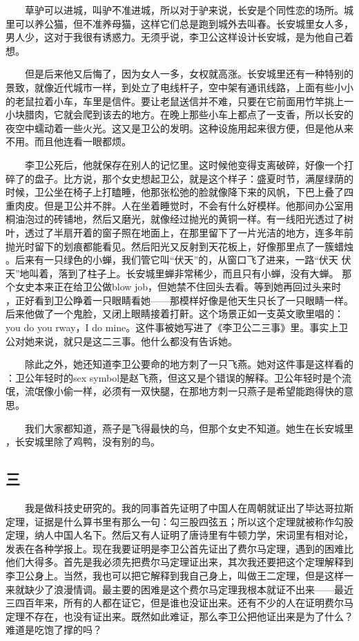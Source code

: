  　　草驴可以进城，叫驴不准进城，所以对于驴来说，长安是个同性恋的场所。城 里可以养公猫，但不准养母猫，这样它们总是跑到城外去叫春。长安城里女人多， 男人少，这对于我很有诱惑力。无须乎说，李卫公这样设计长安城，是为他自己着 想。 

　　但是后来他又后悔了，因为女人一多，女权就高涨。长安城里还有一种特别的 景致，就像近代城市一样，到处立了电线杆子，空中架有通讯线路，上面有些小小 的老鼠拉着小车，车里是信件。要让老鼠送信并不难，只要在它前面用竹竿挑上一 小块腊肉，它就会爬到该去的地方。在晚上那些小车上都点了一支香，所以长安的 夜空中蠕动着一些火光。这又是卫公的发明。这种设施用起来很方便，但是他从来 不用。而且他连看一眼都烦。 

　　李卫公死后，他就保存在别人的记忆里。这时候他变得支离破碎，好像一个打 碎了的盘子。比方说，那个女史想起卫公，就是这个样子：盛夏时节，满屋绿荫的 时候，卫公坐在椅子上打瞌睡，他那张松弛的脸就像降下来的风帆，下巴上叠了四 重肉皮。但是卫公并不胖。人在坐着睡觉时，不会有什么好模样。他那间办公室用 桐油泡过的砖铺地，然后又磨光，就像经过抛光的黄铜一样。有一线阳光透过了树 叶，透过了半扇开着的窗子照在地面上，在那里留下了一片光洁的地方，连多年前 抛光时留下的划痕都能看见。然后阳光又反射到天花板上，好像那里点了一簇蜡烛 。后来有一只绿色的小蝉，我们管它叫“伏天”的，从窗口飞了进来，一路“伏天 伏天”地叫着，落到了柱子上。长安城里蝉非常稀少，而且只有小蝉，没有大蝉。 那个女史本来正在给卫公做blow job，但她禁不住回头去看。等到她再回过头来时 ，正好看到卫公睁着一只眼睛看她——那模样好像是他天生只长了一只眼睛一样。 后来他做了一个鬼脸，又闭上眼睛接着打鼾。这个场景正如一支英文歌里唱的： you do you rway，I do mine。这件事被她写进了《李卫公二三事》里。事实上卫 公对她来说，就只是这二三事。他什么都没有告诉她。

 　　除此之外，她还知道李卫公要命的地方刺了一只飞燕。她对这件事是这样看的 ：卫公年轻时的sex symbol是赵飞燕，但这又是个错误的解释。卫公年轻时是个流 氓，流氓像小偷一样，必须有一双快腿，在那地方刺一只燕子是希望能跑得快的意 思。 

　　我们大家都知道，燕子是飞得最快的乌，但那个女史不知道。她生在长安城里 ，长安城里除了鸡鸭，没有别的鸟。 
 
 
\subsection{三} 
 
 　　我是做科技史研究的。我的同事首先证明了中国人在周朝就证出了毕达哥拉斯 定理，证据是什么算书里有那么一句：勾三股四弦五；所以这个定理就被称作勾股 定理，纳人中国人名下。然后又有人证明了唐诗里有牛顿力学，宋词里有相对论， 发表在各种学报上。现在我要证明是李卫公首先证出了费尔马定理，遇到的困难比 他们大得多。首先是我必须先把费尔马定理证出来，其次我还要把这个定理解释到 李卫公身上。当然，我也可以把它解释到我自己身上，叫做王二定理，但是这样一 来就缺少了浪漫情调。最主要的困难是这个费尔马定理我根本就证不出来——最近 三四百年来，所有的人都在证它，但是谁也没证出来。还有不少的人在证明费尔马 定理不存在，也没有证出来。既然如此难证，那么李卫公把他证出来是为了什么？ 难道是吃饱了撑的吗？

